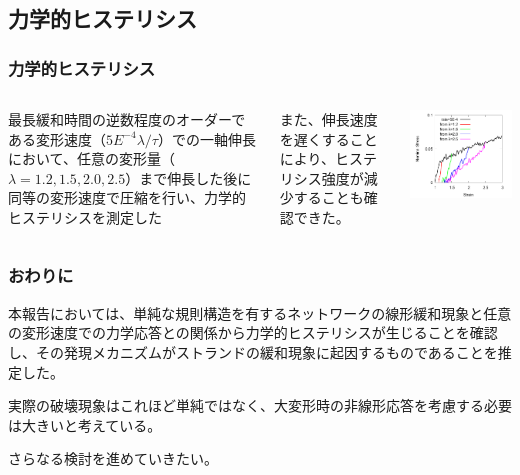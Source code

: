 \documentclass[11pt, dvipdfmx]{beamer}
\begin{document}
\subsection{力学的ヒステリシス}

\begin{frame}
\frametitle{力学的ヒステリシス}

\begin{columns}[totalwidth=1\textwidth]

最長緩和時間の逆数程度のオーダーである変形速度（$5E^{-4}\lambda/\tau$）での一軸伸長において、任意の変形量（$\lambda = 1.2, 1.5, 2.0, 2.5$）まで伸長した後に同等の変形速度で圧縮を行い、力学的ヒステリシスを測定した


また、伸長速度を遅くすることにより、ヒステリシス強度が減少することも確認できた。

\centering
\includegraphics[width=\textwidth]{./fig/N44_rev_SS.pdf}
\end{columns}
\end{frame}

\begin{frame}
\frametitle{おわりに}

本報告においては、単純な規則構造を有するネットワークの線形緩和現象と任意の変形速度での力学応答との関係から力学的ヒステリシスが生じることを確認し、その発現メカニズムがストランドの緩和現象に起因するものであることを推定した。

実際の破壊現象はこれほど単純ではなく、大変形時の非線形応答を考慮する必要は大きいと考えている。

さらなる検討を進めていきたい。
\end{frame}
\end{document}

